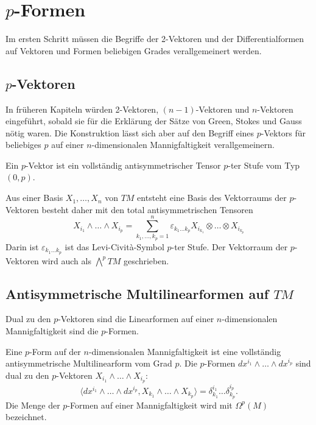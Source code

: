 %
%
\section{$p$-Formen
\label{buch:pformen:section:pformen}}
Im ersten Schritt müssen die Begriffe der 2-Vektoren und der 
Differentialformen auf Vektoren und Formen beliebigen Grades
verallgemeinert werden.

%
%
\subsection{$p$-Vektoren}
In früheren Kapiteln würden 2-Vektoren, $(n-1)$-Vektoren und $n$-Vektoren
eingeführt, sobald sie für die Erklärung der Sätze von Green,
Stokes und Gauss nötig waren.
Die Konstruktion lässt sich aber auf den Begriff eines $p$-Vektors
für beliebiges $p$ auf einer $n$-dimensionalen Mannigfaltigkeit
verallgemeinern.

\begin{definition}
Ein $p$-Vektor ist ein vollständig antisymmetrischer Tensor
$p$-ter Stufe vom Typ $(0,p)$.
\end{definition}

Aus einer Basis $X_1,\dots,X_n$ von $TM$ entsteht eine Basis des
Vektorraums der $p$-Vektoren besteht daher mit den
total antisymmetrischen Tensoren
\[
X_{i_1}\wedge \dots\wedge X_{i_p}
=
\sum_{k_1,\dots,k_p=1}^{n}
\varepsilon_{k_1\dots k_p}
X_{i_{k_1}}\otimes\dots\otimes X_{i_{k_p}}
\]
Darin ist $\varepsilon_{k_1\dots k_p}$ ist das Levi-Cività-Symbol
$p$-ter Stufe.
Der Vektorraum der $p$-Vektoren wird auch als 
$\bigwedge^p TM$ geschrieben.

%
%
\subsection{Antisymmetrische Multilinearformen auf $TM$}
Dual zu den $p$-Vektoren sind die Linearformen auf einer $n$-dimensionalen
Mannigfaltigkeit sind die $p$-Formen.

\begin{definition}
Eine $p$-Form auf der $n$-dimensionalen Mannigfaltigkeit ist eine vollständig
antisymmetrische Multilinearform vom Grad $p$.
Die $p$-Formen $dx^{i_1}\wedge\dots\wedge dx^{i_p}$ sind dual zu den 
$p$-Vektoren $X_{i_1}\wedge\dots\wedge X_{i_p}$:
\[
\langle
dx^{i_1}\wedge\dots\wedge dx^{i_p},
X_{k_1}\wedge\dots\wedge X_{k_p}
\rangle
=
\delta^{i_1}_{k_1}
\dots
\delta^{i_p}_{k_p}.
\]
Die Menge der $p$-Formen auf einer Mannigfaltigkeit wird mit $\Omega^p(M)$
bezeichnet.
%
\end{definition}

